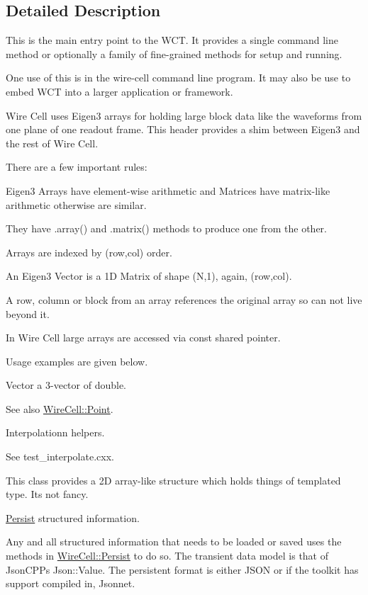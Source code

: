 \subsection{Detailed Description}
This is the main entry point to the W\+CT. It provides a single command line method or optionally a family of fine-\/grained methods for setup and running.

One use of this is in the {\ttfamily wire-\/cell} command line program. It may also be use to embed W\+CT into a larger application or framework.

Wire Cell uses Eigen3 arrays for holding large block data like the waveforms from one plane of one readout frame. This header provides a shim between Eigen3 and the rest of Wire Cell.

There are a few important rules\+:


\begin{DoxyItemize}
\item Eigen3 Arrays have element-\/wise arithmetic and Matrices have matrix-\/like arithmetic otherwise are similar.
\item They have .array() and .matrix() methods to produce one from the other.
\item Arrays are indexed by (row,col) order.
\item An Eigen3 Vector is a 1D Matrix of shape (N,1), again, (row,col).
\item A row, column or block from an array references the original array so can not live beyond it.
\item In Wire Cell large arrays are accessed via const shared pointer.
\end{DoxyItemize}

Usage examples are given below.

Vector a 3-\/vector of double.

See also \hyperlink{namespace_wire_cell_ab2b2565fa6432efbb4513c14c988cda9}{Wire\+Cell\+::\+Point}.

Interpolationn helpers.

See test\+\_\+interpolate.\+cxx.

This class provides a 2D array-\/like structure which holds things of templated type. It\textquotesingle{}s not fancy.

\hyperlink{namespace_wire_cell_1_1_persist}{Persist} structured information.

Any and all structured information that needs to be loaded or saved uses the methods in \hyperlink{namespace_wire_cell_1_1_persist}{Wire\+Cell\+::\+Persist} to do so. The transient data model is that of Json\+C\+PP\textquotesingle{}s Json\+::\+Value. The persistent format is either J\+S\+ON or if the toolkit has support compiled in, Jsonnet.

